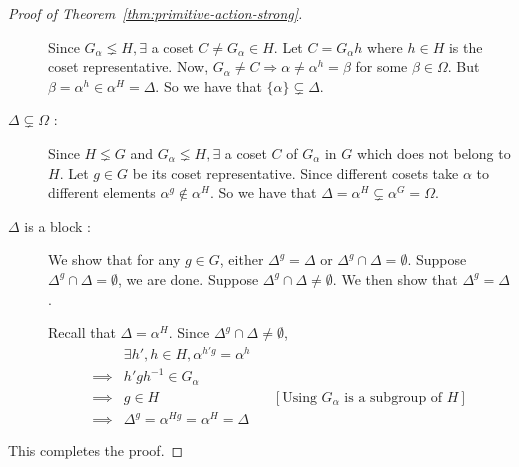 \begin{proof}[Proof of Theorem~\ref{thm:primitive-action-strong}]
\begin{description}
	Since $G_\alpha \lneq H,\exists$ a coset $C \neq G_\alpha \in H$. Let
	$C = G_\alpha h$ where $h \in H$ is the coset representative.
	Now, $G_\alpha \neq C \Rightarrow \alpha  \ne
	\alpha^h = \beta$ for some $\beta \in \Omega$. But $\beta = \alpha^h
	\in \alpha^H = \Delta$.  So we have that $\{\alpha\} \subsetneq
	\Delta$.

	\item[$\Delta \subsetneq \Omega$ :] 
	Since $H \lneq G$ and $G_\alpha \lneq H, \exists$ a coset $C$ of
	$G_\alpha$ in $G$ which does not belong to $H$. Let $g \in G$ be its
	coset representative. Since different cosets
	take $\alpha$ to different elements $\alpha^g \notin \alpha^H$. So we
	have that $\Delta = \alpha^H \subsetneq \alpha^G = \Omega$. 

	\item[$\Delta$ is a block :]
		We show that for any $g \in G$, either $\Delta^g = \Delta$ or
		$\Delta^g \cap \Delta = \emptyset$. Suppose $\Delta^g \cap
		\Delta = \emptyset$, we are done. Suppose $\Delta^g \cap
		\Delta \neq \emptyset$. We then show that $\Delta^g = \Delta$.
		
		Recall that $\Delta = \alpha^H$. Since $\Delta^g \cap \Delta
		\ne \emptyset$, 
		\begin{align*}
		& \exists h',h \in H, \alpha^{h'g} = \alpha^h \\ 
		\implies & h'gh^{-1} \in G_\alpha \\
		\implies & g \in H && [\text{Using $G_\alpha$ is a subgroup of
		$H$}] \\
		\implies & \Delta^g = \alpha^{Hg} = \alpha^H = \Delta
		\end{align*}
\end{description}
This completes the proof.
\end{proof}





